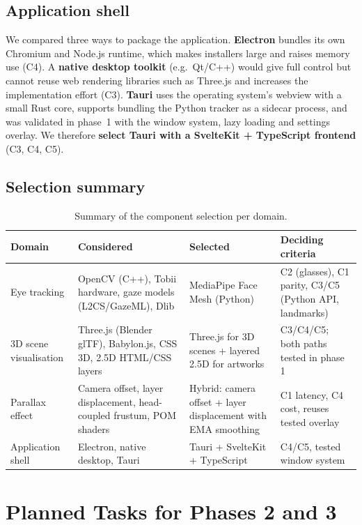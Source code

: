 \documentclass[11pt,a4paper]{article}
\begin{document}
\subsection{Application shell}

We compared three ways to package the application. \textbf{Electron}
bundles its own Chromium and Node.js runtime, which makes installers large and
raises memory use (C4). A \textbf{native desktop toolkit} (e.g.\ Qt/C++) would
give full control but cannot reuse web rendering libraries such as Three.js and
increases the implementation effort (C3). \textbf{Tauri} uses the operating
system's webview with a small Rust core, supports bundling the Python tracker
as a sidecar process, and was validated in phase~1 with the window system,
lazy loading and settings overlay. We therefore \textbf{select Tauri with a
SvelteKit + TypeScript frontend} (C3, C4, C5).

\subsection{Selection summary}

\begin{table}[H]
\centering
\caption{Summary of the component selection per domain.}
\label{tab:selection}
\begin{tabularx}{\textwidth}{lLLL}
\toprule
\textbf{Domain} & \textbf{Considered} & \textbf{Selected} & \textbf{Deciding criteria} \\
\midrule
Eye tracking & OpenCV (C++), Tobii hardware, gaze models (L2CS/GazeML), Dlib & MediaPipe Face Mesh (Python) & C2 (glasses), C1 parity, C3/C5 (Python API, landmarks) \\
3D scene visualisation & Three.js (Blender glTF), Babylon.js, CSS 3D, 2.5D HTML/CSS layers & Three.js for 3D scenes + layered 2.5D for artworks & C3/C4/C5; both paths tested in phase 1 \\
Parallax effect & Camera offset, layer displacement, head-coupled frustum, POM shaders & Hybrid: camera offset + layer displacement with EMA smoothing & C1 latency, C4 cost, reuses tested overlay \\
Application shell & Electron, native desktop, Tauri & Tauri + SvelteKit + TypeScript & C4/C5, tested window system \\
\bottomrule
\end{tabularx}
\end{table}

\section{Planned Tasks for Phases 2 and 3}
\label{sec:planning}
\end{document}
